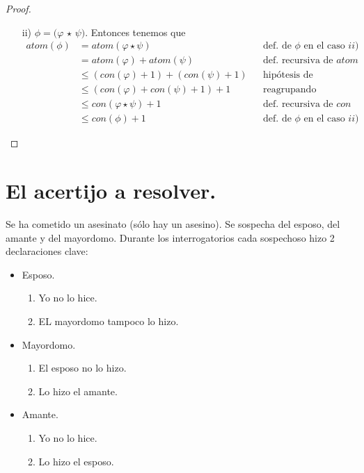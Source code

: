 \documentclass[letterpaper,11pt]{article}
\begin{document}
\begin{proof}
\begin{itemize}
            \item[ii)] $\phi = (\varphi$ $\star$ $\psi)$. Entonces tenemos que 
            \begin{align*}
                atom(\phi) &= atom(\varphi \star \psi) 
                           && \text{def. de $\phi$ en el caso $ii)$} \\ 
                           &= atom(\varphi) + atom(\psi)
                           && \text{def. recursiva de $atom$} \\
                           &\leq (con(\varphi) + 1) + (con(\psi) + 1)
                           && \text{hipótesis de inducción} \\
                           &\leq (con(\varphi) + con(\psi) + 1) + 1
                           && \text{reagrupando} \\
                           &\leq con (\varphi \star \psi) + 1
                           && \text{def. recursiva de $con$} \\
                           &\leq con(\phi) + 1
                           && \text{def. de $\phi$ en el caso $ii)$}
            \end{align*}

        \end{itemize} 
        
    \end{proof}

    \section{El acertijo a resolver.}
    Se ha cometido un asesinato (sólo hay un asesino). Se sospecha del esposo,
    del amante y del mayordomo. Durante los interrogatorios cada sospechoso 
    hizo 2 declaraciones clave:
    \begin{itemize}
        \item Esposo.
        \begin{enumerate}
            \item Yo no lo hice.
            \item EL mayordomo tampoco lo hizo.
        \end{enumerate}
        \item Mayordomo.
        \begin{enumerate}
            \item El esposo no lo hizo.
            \item Lo hizo el amante.
        \end{enumerate}
        \item Amante.
        \begin{enumerate}
            \item Yo no lo hice.
            \item Lo hizo el esposo.
        \end{enumerate}
    \end{itemize}
\end{document}
